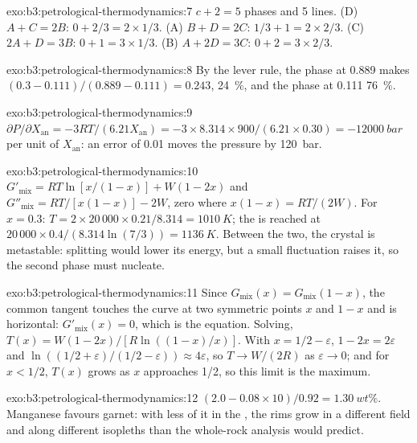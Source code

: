 \begin{solution}{exo:b3:petrological-thermodynamics:7}
$c + 2 = 5$ phases and 5 lines. (D) $A + C = 2B$: $0 + 2/3 = 2\times1/3$. (A)
$B + D = 2C$: $1/3 + 1 = 2\times2/3$. (C) $2A + D = 3B$: $0 + 1 = 3\times1/3$.
(B) $A + 2D = 3C$: $0 + 2 = 3\times2/3$.
\end{solution}

\begin{solution}{exo:b3:petrological-thermodynamics:8}
By the lever rule, the phase at 0.889 makes $(0.3 - 0.111)/(0.889 - 0.111) =
0.243$, \qty{24}{\percent}, and the phase at 0.111 \qty{76}{\percent}.
\end{solution}

\begin{solution}{exo:b3:petrological-thermodynamics:9}
$\partial P/\partial X_{\text{an}} = -3RT/(6.21X_{\text{an}}) =
-3\times8.314\times900/(6.21\times0.30) = \qty{-12000}{bar}$ per unit of
$X_{\text{an}}$: an error of 0.01 moves the pressure by \qty{120}{bar}.
\end{solution}

\begin{solution}{exo:b3:petrological-thermodynamics:10}
$G'_{\text{mix}} = RT\ln[x/(1 - x)] + W(1 - 2x)$ and $G''_{\text{mix}} =
RT/[x(1 - x)] - 2W$, zero where $x(1 - x) = RT/(2W)$. For $x = 0.3$: $T =
2\times20\,000\times0.21/8.314 = \qty{1010}{K}$; the  is reached at
$20\,000\times0.4/(8.314\ln(7/3)) = \qty{1136}{K}$. Between the two, the
crystal is metastable: splitting would lower its energy, but a small
fluctuation raises it, so the second phase must nucleate.
\end{solution}

\begin{solution}{exo:b3:petrological-thermodynamics:11}
Since $G_{\text{mix}}(x) = G_{\text{mix}}(1 - x)$, the common tangent touches
the curve at two symmetric points $x$ and $1 - x$ and is horizontal:
$G'_{\text{mix}}(x) = 0$, which is the equation. Solving, $T(x) = W(1 -
2x)/[R\ln((1 - x)/x)]$. With $x = 1/2 - \varepsilon$, $1 - 2x = 2\varepsilon$
and $\ln((1/2 + \varepsilon)/(1/2 - \varepsilon)) \approx 4\varepsilon$, so
$T \to W/(2R)$ as $\varepsilon \to 0$; and for $x < 1/2$, $T(x)$ grows as $x$
approaches 1/2, so this limit is the maximum.
\end{solution}

\begin{solution}{exo:b3:petrological-thermodynamics:12}
$(2.0 - 0.08\times10)/0.92 = \qty{1.30}{wt\percent}$. Manganese favours
garnet: with less of it in the , the rims grow in a
different field and along different isopleths than the whole-rock analysis
would predict.
\end{solution}

